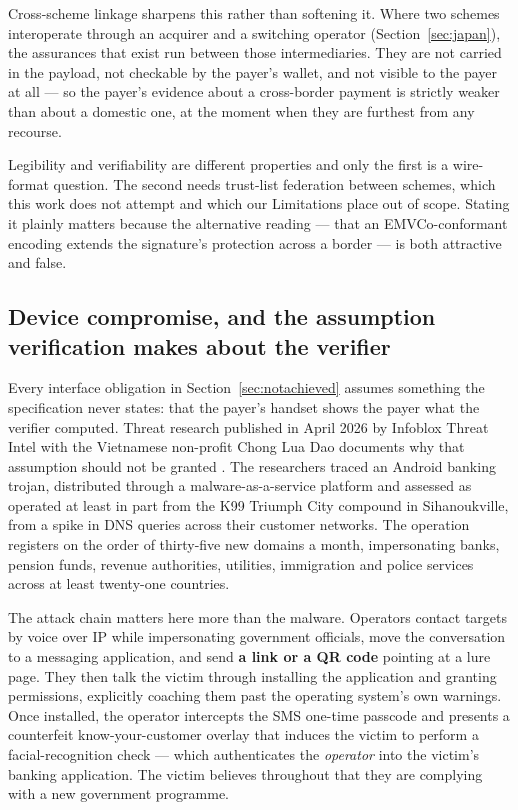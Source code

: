 \documentclass[10pt,a4paper,twocolumn]{article}
\begin{document}
Cross-scheme linkage sharpens this rather than softening it. Where two schemes
interoperate through an acquirer and a switching operator
(Section~\ref{sec:japan}), the assurances that exist run between those
intermediaries. They are not carried in the payload, not checkable by the
payer's wallet, and not visible to the payer at all --- so the payer's evidence
about a cross-border payment is strictly weaker than about a domestic one, at
the moment when they are furthest from any recourse.

Legibility and verifiability are different properties and only the first is a
wire-format question. The second needs trust-list federation between schemes,
which this work does not attempt and which our Limitations place out of scope.
Stating it plainly matters because the alternative reading --- that an
EMVCo-conformant encoding extends the signature's protection across a border ---
is both attractive and false.

\subsection{Device compromise, and the assumption verification makes about the verifier}
\label{sec:device}

Every interface obligation in Section~\ref{sec:notachieved} assumes something the
specification never states: that the payer's handset shows the payer what the
verifier computed. Threat research published in April 2026 by Infoblox Threat
Intel with the Vietnamese non-profit Chong Lua Dao documents why that assumption
should not be granted \citep{infoblox2026cambodia}. The researchers traced an
Android banking trojan, distributed through a malware-as-a-service platform and
assessed as operated at least in part from the K99 Triumph City compound in
Sihanoukville, from a spike in DNS queries across their customer networks. The
operation registers on the order of thirty-five new domains a month,
impersonating banks, pension funds, revenue authorities, utilities, immigration
and police services across at least twenty-one countries.

The attack chain matters here more than the malware. Operators contact targets
by voice over IP while impersonating government officials, move the conversation
to a messaging application, and send \textbf{a link or a QR code} pointing at a
lure page. They then talk the victim through installing the application and
granting permissions, explicitly coaching them past the operating system's own
warnings. Once installed, the operator intercepts the SMS one-time passcode and
presents a counterfeit know-your-customer overlay that induces the victim to
perform a facial-recognition check --- which authenticates the \emph{operator}
into the victim's banking application. The victim believes throughout that they
are complying with a new government programme.
\end{document}

